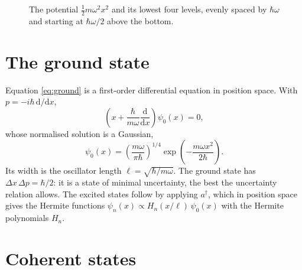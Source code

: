 \documentclass[10pt,twocolumn]{article}
\newcommand{\ad}{a^\dagger}
\begin{document}
\begin{figure}[t]
\centering
{}
\caption{The potential $\frac12 m\omega^2x^2$ and its lowest four
levels, evenly spaced by $\hbar\omega$ and starting at
$\hbar\omega/2$ above the bottom.}
\label{fig:levels}
\end{figure}

\section{The ground state}

Equation \eqref{eq:ground} is a first-order differential equation in
position space. With $p = -i\hbar\,\mathrm{d}/\mathrm{d}x$,
\begin{equation}
  \left(x + \frac{\hbar}{m\omega}\frac{\mathrm{d}}{\mathrm{d}x}\right)\psi_0(x) = 0 ,
\end{equation}
whose normalised solution is a Gaussian,
\begin{equation}
  \psi_0(x) = \left(\frac{m\omega}{\pi\hbar}\right)^{1/4}
  \exp\!\left(-\frac{m\omega x^2}{2\hbar}\right).
\end{equation}
Its width is the oscillator length $\ell = \sqrt{\hbar/m\omega}$. The
ground state has $\Delta x\,\Delta p = \hbar/2$: it is a state of minimal
uncertainty, the best the uncertainty relation allows. The excited states
follow by applying $\ad$, which in position space gives the Hermite
functions $\psi_n(x) \propto H_n(x/\ell)\,\psi_0(x)$ with the Hermite
polynomials $H_n$.

\section{Coherent states}
\end{document}
